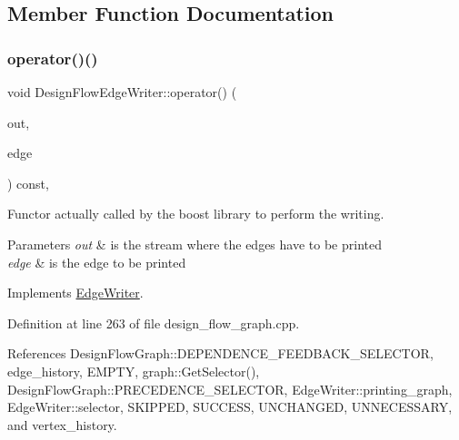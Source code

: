 \subsection{Member Function Documentation}
\mbox{\label{classDesignFlowEdgeWriter_ae15c12d95676a26eb77a96356000007e}} 
\subsubsection{\texorpdfstring{operator()()}{operator()()}}
{\footnotesize\ttfamily void Design\+Flow\+Edge\+Writer\+::operator() (\begin{DoxyParamCaption}\item[{std\+::ostream \&}]{out,  }\item[{const \hyperlink{graph_8hpp_a9eb9afea34e09f484b21f2efd263dd48}{Edge\+Descriptor} \&}]{edge }\end{DoxyParamCaption}) const\hspace{0.3cm}{\ttfamily [override]}, {\ttfamily [virtual]}}



Functor actually called by the boost library to perform the writing. 


\begin{DoxyParams}{Parameters}
{\em out} & is the stream where the edges have to be printed \\
\hline
{\em edge} & is the edge to be printed \\
\hline
\end{DoxyParams}


Implements \hyperlink{classEdgeWriter_a04dc5b68a11dcf253e21d29dfd1e06c3}{Edge\+Writer}.



Definition at line 263 of file design\+\_\+flow\+\_\+graph.\+cpp.



References Design\+Flow\+Graph\+::\+D\+E\+P\+E\+N\+D\+E\+N\+C\+E\+\_\+\+F\+E\+E\+D\+B\+A\+C\+K\+\_\+\+S\+E\+L\+E\+C\+T\+OR, edge\+\_\+history, E\+M\+P\+TY, graph\+::\+Get\+Selector(), Design\+Flow\+Graph\+::\+P\+R\+E\+C\+E\+D\+E\+N\+C\+E\+\_\+\+S\+E\+L\+E\+C\+T\+OR, Edge\+Writer\+::printing\+\_\+graph, Edge\+Writer\+::selector, S\+K\+I\+P\+P\+ED, S\+U\+C\+C\+E\+SS, U\+N\+C\+H\+A\+N\+G\+ED, U\+N\+N\+E\+C\+E\+S\+S\+A\+RY, and vertex\+\_\+history.

